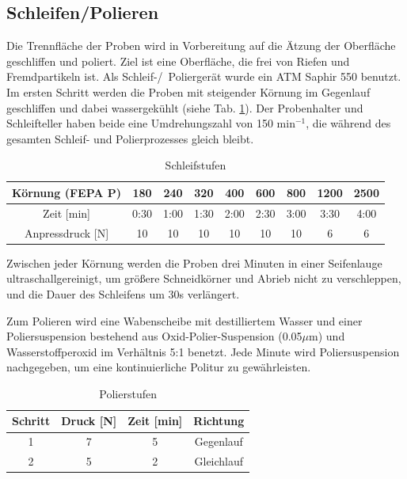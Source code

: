 \subsection*{Schleifen/Polieren}

Die Trennfläche der Proben wird in Vorbereitung auf die Ätzung der Oberfläche geschliffen und poliert. Ziel ist eine Oberfläche, die frei von Riefen und Fremdpartikeln ist. Als Schleif-/~Poliergerät wurde ein ATM Saphir 550 benutzt.
Im ersten Schritt werden die Proben mit steigender Körnung im Gegenlauf geschliffen und dabei wassergekühlt (siehe Tab. \ref{tab:Schleifstufen}). Der Probenhalter und Schleifteller haben beide eine Umdrehungszahl von 150 min$^{-1}$, die während des gesamten Schleif- und Polierprozesses gleich bleibt.   

\begin{table}[h]
	\centering
	\begin{tabular}{|c|c|c|c|c|c|c|c|c|}
		
		\hline 
		Körnung (FEPA P) & 180 & 240 & 320 & 400 & 600 & 800 & 1200 & 2500 \\ 
		\hline 
		Zeit [min] & 0:30 & 1:00 & 1:30 & 2:00 & 2:30 & 3:00 & 3:30 & 4:00 \\ 
		\hline 
		Anpressdruck [N] & 10&10&10&10&10&10&6&6\\
		\hline
	\end{tabular} 
	\caption{Schleifstufen}
	\label{tab:Schleifstufen}
\end{table}

Zwischen jeder Körnung werden die Proben drei Minuten in einer Seifenlauge ultraschallgereinigt, um größere Schneidkörner und Abrieb nicht zu verschleppen, und die Dauer des Schleifens um 30s verlängert. 

Zum Polieren wird eine Wabenscheibe mit destilliertem Wasser und einer Poliersuspension bestehend aus Oxid-Polier-Suspension (0.05$\mu$m) und Wasserstoffperoxid im Verhältnis 5:1 benetzt. Jede Minute wird Poliersuspension nachgegeben, um eine kontinuierliche Politur zu gewährleisten.

\begin{table}[h]
	\centering
	
	\begin{tabular}{|c|c|c|c|}
		\hline 
		Schritt & Druck [N] & Zeit [min] & Richtung \\ 
		\hline 
		1 & 7 & 5 & Gegenlauf \\ 
		\hline 
		2 & 5 & 2 & Gleichlauf \\ 
		\hline 
	\end{tabular} 
	\caption{Polierstufen}
	\label{tab:Polierstufen}
\end{table}

